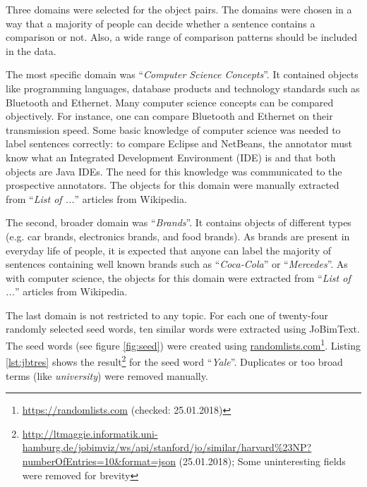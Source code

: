Three domains were selected for the object pairs. The domains were chosen in a way that a majority of people can decide whether a sentence contains a comparison or not. Also, a wide range of comparison patterns should be included in the data.

The most specific domain was \enquote{\emph{Computer Science Concepts}}. It contained objects like programming languages, database products and technology standards such as Bluetooth and Ethernet.  Many computer science concepts can be compared objectively. For instance, one can compare Bluetooth and Ethernet on their transmission speed. Some basic knowledge of computer science was needed to label sentences correctly: to compare Eclipse and NetBeans, the annotator must know what an Integrated Development Environment (IDE) is and that both objects are Java IDEs.  The need for this knowledge was communicated to the prospective annotators. The objects for this domain were manually extracted from \enquote{\emph{List of ...}} articles from Wikipedia.

The second, broader domain was \enquote{\emph{Brands}}. It contains objects of different types (e.g. car brands, electronics brands, and food brands). As brands are present in everyday life of people, it is expected that anyone can label the majority of sentences containing well known brands such as \enquote{\emph{Coca-Cola}} or \enquote{\emph{Mercedes}}. As with computer science, the objects for this domain were extracted from \enquote{\emph{List of ...}} articles from Wikipedia.

The last domain is not restricted to any topic. For each one of twenty-four randomly selected seed words, ten similar words were extracted using JoBimText. The seed words (see figure \ref{fig:seed}) were created using \url{randomlists.com}\footnote{\url{https://randomlists.com}  (checked: 25.01.2018)}. Listing \ref{lst:jbtres} shows the result\footnote{\url{http://ltmaggie.informatik.uni-hamburg.de/jobimviz/ws/api/stanford/jo/similar/harvard\%23NP?numberOfEntries=10&format=json} (25.01.2018); Some uninteresting fields were removed for brevity} for the seed word \enquote{\emph{Yale}}. Duplicates or too broad terms (like \emph{university}) were removed manually.


